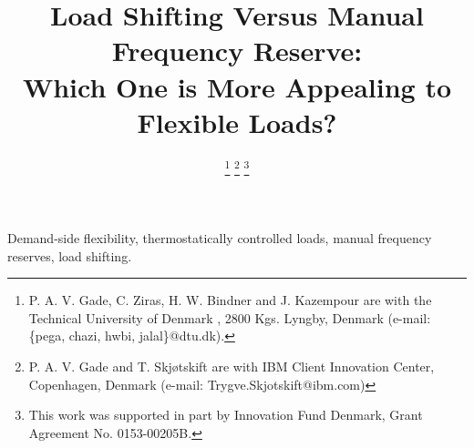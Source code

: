 \documentclass[lettersize,journal]{IEEEtran}
\begin{document}
\title{Load Shifting Versus Manual Frequency Reserve: \\ Which One is More Appealing to Flexible Loads?}

\author{
    \vspace{-0.38cm}
    \thanks{P. A. V. Gade, C. Ziras, H. W. Bindner and J. Kazempour are with the Technical University of Denmark , 2800 Kgs. Lyngby, Denmark (e-mail: \{pega, chazi, hwbi, jalal\}@dtu.dk).}
    \thanks{P. A. V. Gade and T. Skjøtskift are with IBM Client Innovation Center, Copenhagen, Denmark (e-mail: Trygve.Skjotskift@ibm.com)}
    \thanks{This work  was supported in part by Innovation Fund Denmark, Grant Agreement No. 0153-00205B.}
}





\maketitle


\begin{abstract}
    
\end{abstract}

\begin{IEEEkeywords}
    Demand-side flexibility, thermostatically controlled loads, manual frequency reserves, load shifting.
\end{IEEEkeywords}





\end{document}
